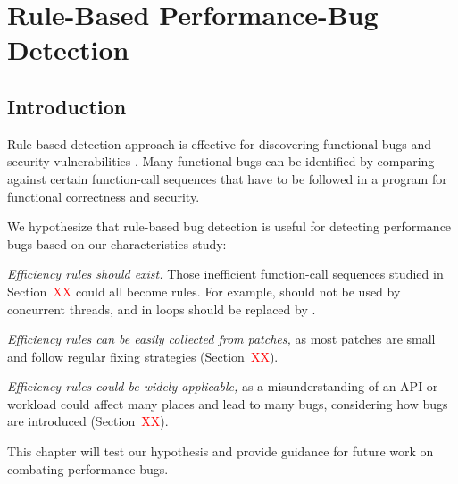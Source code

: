 \chapter[Rule-Based Performance-Bug Detection]{Rule-Based Performance-Bug Detection}
\label{chap:detec}

\section{Introduction}

Rule-based detection approach is effective for discovering functional bugs
and security vulnerabilities \citep{chouasplos00,billpugh,PRMiner05,semanticpatch,fortify}. 
Many functional bugs can be identified by comparing against certain 
function-call sequences that have to be followed in a program 
for functional correctness and security.

We hypothesize that rule-based bug detection is useful for detecting performance 
bugs based on our characteristics study:


\emph{Efficiency rules should exist.} Those inefficient function-call sequences 
studied in Section~\textcolor{red}{XX} could all become rules.
For example,  should not be used by concurrent threads, and
 in loops should be replaced by .

\emph{Efficiency rules can be easily collected from patches,} as 
most patches are small and follow regular fixing strategies 
(Section~\textcolor{red}{XX}).

\emph{Efficiency rules could be widely applicable,} as 
a misunderstanding of an API or workload could affect many places and
lead to many bugs, considering how bugs are introduced 
(Section~\textcolor{red}{XX}).


This chapter will test our hypothesis and provide guidance for future work 
on combating performance bugs.

